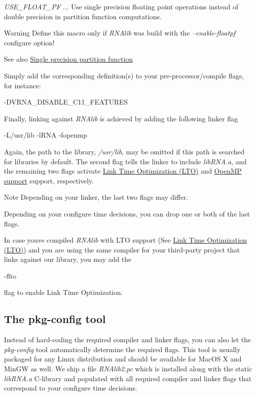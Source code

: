 \begin{DoxyItemize}
\item {\itshape U\+S\+E\+\_\+\+F\+L\+O\+A\+T\+\_\+\+PF} $\ldots$ Use single precision floating point operations instead of double precision in partition function computations. \begin{DoxyWarning}{Warning}
Define this macro only if {\itshape R\+N\+Alib} was build with the {\itshape --enable-\/floatpf} configure option! 
\end{DoxyWarning}
\begin{DoxySeeAlso}{See also}
\hyperlink{install_config_float_pf}{Single precision partition function}
\end{DoxySeeAlso}

\end{DoxyItemize}Simply add the corresponding definition(s) to your pre-\/processor/compile flags, for instance\+:

\begin{DoxyVerb}-DVRNA_DISABLE_C11_FEATURES
\end{DoxyVerb}


Finally, linking against {\itshape R\+N\+Alib} is achieved by adding the following linker flag

\begin{DoxyVerb}-L/usr/lib -lRNA -fopenmp
\end{DoxyVerb}


Again, the path to the library, {\itshape /usr/lib}, may be omitted if this path is searched for libraries by default. The second flag tells the linker to include {\itshape lib\+R\+N\+A.\+a}, and the remaining two flags activate \hyperlink{install_config_lto}{Link Time Optimization (L\+TO)} and \hyperlink{install_config_openmp}{Open\+MP support} support, respectively. \begin{DoxyNote}{Note}
Depending on your linker, the last two flags may differ. 

Depending on your configure time decisions, you can drop one or both of the last flags. 

In case you\textquotesingle{}ve compiled {\itshape R\+N\+Alib} with L\+TO support (See \hyperlink{install_config_lto}{Link Time Optimization (L\+TO)}) and you are using the same compiler for your third-\/party project that links against our library, you may add the
\begin{DoxyCode}
-flto 
\end{DoxyCode}
 flag to enable Link Time Optimization.
\end{DoxyNote}
\hypertarget{install_linking_pkgconfig}{}\subsection{The pkg-\/config tool}\label{install_linking_pkgconfig}
Instead of hard-\/coding the required compiler and linker flags, you can also let the {\itshape pkg-\/config} tool automatically determine the required flags. This tool is usually packaged for any Linux distribution and should be available for Mac\+OS X and Min\+GW as well. We ship a file {\itshape R\+N\+Alib2.\+pc} which is installed along with the static {\itshape lib\+R\+N\+A.\+a} C-\/library and populated with all required compiler and linker flags that correspond to your configure time decisions.

